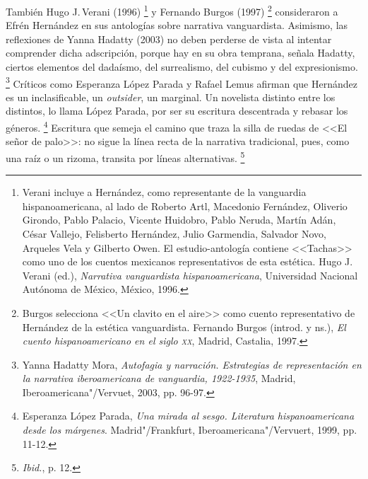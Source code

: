 \documentclass[14pt,twoside,final]{extbook} %
\let\oldfootnote\footnote
\renewcommand\footnote[1]{%
\oldfootnote{\hspace{1mm}#1}}
\begin{document}
También Hugo J.\,Verani (1996)\footnote{Verani incluye a Hernández, como representante de la vanguardia hispanoamericana, al lado de Roberto Artl, Macedonio Fernández, Oliverio Girondo, Pablo Palacio, Vicente Huidobro, Pablo Neruda, Martín Adán, César Vallejo, Felisberto Hernández, Julio Garmendia, Salvador Novo, Arqueles Vela y Gilberto Owen. El estudio-antología contiene <<Tachas>> como uno de los cuentos mexicanos representativos de esta estética. Hugo J.\,Verani (ed.), \emph{Narrativa vanguardista hispanoamericana}, Universidad Nacional Autónoma de México, México, 1996.} y Fernando Burgos (1997)\footnote{Burgos selecciona <<Un clavito en el aire>> como cuento representativo de Hernández de la estética vanguardista. Fernando Burgos (introd. y ns.), \emph{El cuento hispanoamericano en el siglo \textsc{xx}}, Madrid, Castalia, 1997.} consideraron a Efrén Hernández en sus antologías sobre narrativa vanguardista. Asimismo, las reflexiones de Yanna Hadatty (2003) no deben perderse de vista al intentar comprender dicha adscripción, porque hay en su obra temprana, señala Hadatty, ciertos elementos del dadaísmo, del surrealismo, del cubismo y del expresionismo.\footnote{Yanna Hadatty Mora, \emph{Autofagia y narración. Estrategias de representación en la narrativa
iberoamericana de vanguardia, 1922-1935}, Madrid, Iberoamericana"/Vervuet, 2003, pp. 96-97.} Críticos como Esperanza López Parada y Rafael Lemus afirman que Hernández
es un inclasificable, un \emph{outsider}, un marginal. Un novelista distinto entre los distintos, lo llama López Parada, por ser su escritura descentrada y rebasar los géneros.\footnote{Esperanza López Parada, \emph{Una mirada al sesgo. Literatura hispanoamericana desde los márgenes}. Madrid"/Frankfurt, Iberoamericana"/Vervuert, 1999, pp. 11-12.} Escritura que semeja el camino que traza la silla de ruedas de <<El señor de palo>>: no sigue la línea recta de la narrativa tradicional, pues, como una raíz o un rizoma, transita por líneas alternativas.\footnote{\emph{Ibid.}, p. 12.}
\end{document}
